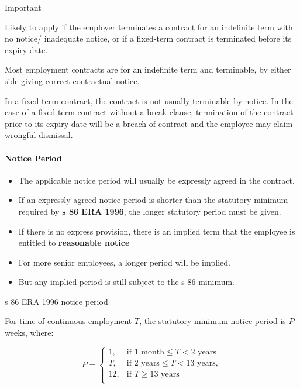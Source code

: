 \documentclass[
]{article}
\providecommand{\tightlist}{%
  \setlength{\itemsep}{0pt}\setlength{\parskip}{0pt}}
\newenvironment{env-5790440e-99ac-43f3-a419-ec39351cd678}
{
    \savenotes\tcolorbox[blanker,breakable,left=5pt,borderline west={2pt}{-4pt}{pink}]
}
{
    \endtcolorbox\spewnotes
}
\newenvironment{env-4858fdc4-d38f-4618-aa87-a7560fa03f07}
{
    \savenotes\tcolorbox[blanker,breakable,left=5pt,borderline west={2pt}{-4pt}{cyan}]
}
{
    \endtcolorbox\spewnotes
}
\begin{document}
\begin{env-4858fdc4-d38f-4618-aa87-a7560fa03f07}

Important

Likely to apply if the employer terminates a contract for an indefinite
term with no notice/ inadequate notice, or if a fixed-term contract is
terminated before its expiry date.

\end{env-4858fdc4-d38f-4618-aa87-a7560fa03f07}

Most employment contracts are for an indefinite term and terminable, by
either side giving correct contractual notice.

In a fixed-term contract, the contract is not usually terminable by
notice. In the case of a fixed-term contract without a break clause,
termination of the contract prior to its expiry date will be a breach of
contract and the employee may claim wrongful dismissal.

\hypertarget{notice-period}{%
\paragraph{Notice Period}\label{notice-period}}

\begin{itemize}
\tightlist
\item
  The applicable notice period will usually be expressly agreed in the
  contract.
\item
  If an expressly agreed notice period is shorter than the statutory
  minimum required by \textbf{s 86 ERA 1996}, the longer statutory
  period must be given.
\item
  If there is no express provision, there is an implied term that the
  employee is entitled to \textbf{reasonable notice}
\item
  For more senior employees, a longer period will be implied.
\item
  But any implied period is still subject to the s 86 minimum.
\end{itemize}

\begin{env-5790440e-99ac-43f3-a419-ec39351cd678}

s 86 ERA 1996 notice period

For time of continuous employment {\(T\)}, the statutory minimum notice
period is {\(P\)} weeks, where:

\[P = \left\{ \begin{matrix}
{1,} & {\text{if~}1\text{~month} \leq T < 2\text{~years}} \\
{T,} & {\text{if~}2\text{~years} \leq T < 13\text{~years},} \\
{12,} & {\text{if~}T \geq 13\text{~years}} \\
\end{matrix} \right.\]

\end{env-5790440e-99ac-43f3-a419-ec39351cd678}
\end{document}
